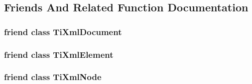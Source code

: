 \subsection{Friends And Related Function Documentation}
\hypertarget{class_ti_xml_base_a173617f6dfe902cf484ce5552b950475}{
\subsubsection[{Ti\-Xml\-Document}]{\setlength{\rightskip}{0pt plus 5cm}friend class {\bf Ti\-Xml\-Document}\hspace{0.3cm}{\ttfamily [friend]}}}\label{class_ti_xml_base_a173617f6dfe902cf484ce5552b950475}
\hypertarget{class_ti_xml_base_ab6592e32cb9132be517cc12a70564c4b}{
\subsubsection[{Ti\-Xml\-Element}]{\setlength{\rightskip}{0pt plus 5cm}friend class {\bf Ti\-Xml\-Element}\hspace{0.3cm}{\ttfamily [friend]}}}\label{class_ti_xml_base_ab6592e32cb9132be517cc12a70564c4b}
\hypertarget{class_ti_xml_base_a218872a0d985ae30e78c55adc4bdb196}{
\subsubsection[{Ti\-Xml\-Node}]{\setlength{\rightskip}{0pt plus 5cm}friend class {\bf Ti\-Xml\-Node}\hspace{0.3cm}{\ttfamily [friend]}}}\label{class_ti_xml_base_a218872a0d985ae30e78c55adc4bdb196}


